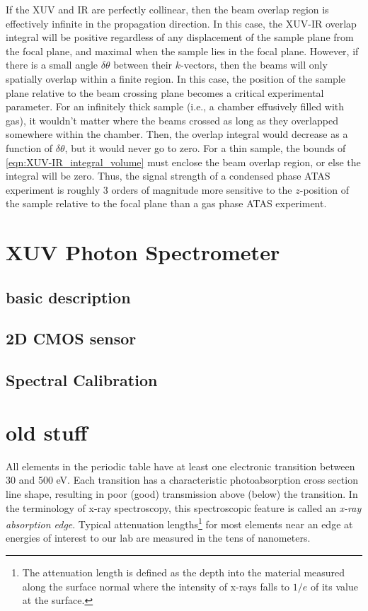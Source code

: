 If the XUV and IR are perfectly collinear, then the beam overlap region is effectively infinite in the propagation direction. In this case, the XUV-IR overlap integral will be positive regardless of any displacement of the sample plane from the focal plane, and maximal when the sample lies in the focal plane. However, if there is a small angle $\delta \theta$ between their $k$-vectors, then the beams will only spatially overlap within a finite region. In this case, the position of the sample plane relative to the beam crossing plane becomes a critical experimental parameter. For an infinitely thick sample (i.e., a chamber effusively filled with gas), it wouldn't matter where the beams crossed as long as they overlapped somewhere within the chamber. Then, the overlap integral would decrease as a function of $\delta \theta$, but it would never go to zero. For a thin sample, the bounds of \cref{eqn:XUV-IR_integral_volume} must enclose the beam overlap region, or else the integral will be zero. Thus, the signal strength of a condensed phase ATAS experiment is roughly 3 orders of magnitude more sensitive to the $z$-position of the sample relative to the focal plane than a gas phase ATAS experiment.


\section{XUV Photon Spectrometer}
\label{sec:XUV_spectrometer}


\subsection{basic description}

\subsection{2D CMOS sensor}

\subsection{Spectral Calibration}

\section{old stuff}


All elements in the periodic table have at least one electronic transition between 30 and 500 eV. Each transition has a characteristic photoabsorption cross section line shape, resulting in poor (good) transmission above (below) the transition. In the terminology of x-ray spectroscopy, this spectroscopic feature is called an \textit{x-ray absorption edge}. Typical attenuation lengths\footnote{The attenuation length is defined as the depth into the material measured along the surface normal where the intensity of x-rays falls to $1/e$ of its value at the surface.} for most elements near an edge at energies of interest to our lab are measured in the tens of nanometers.


